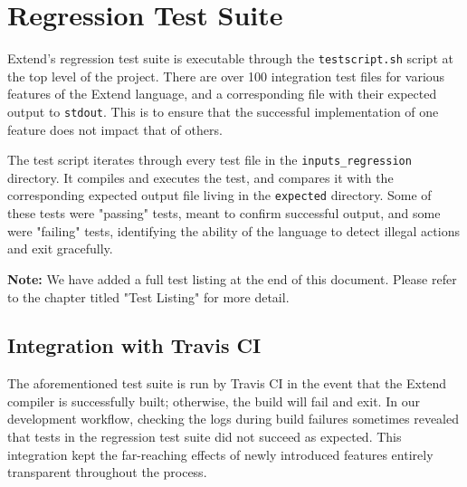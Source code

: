 \section{Regression Test Suite}
Extend's regression test suite is executable through the \texttt{testscript.sh} script at the top level of the project. There are over 100 integration test files for various features of the Extend language, and a corresponding file with their expected output to \texttt{stdout}. This is to ensure that the successful implementation of one feature does not impact that of others.

\medskip \noindent
The test script iterates through every test file in the \texttt{inputs\_regression} directory. It compiles and executes the test, and compares it with the corresponding expected output file living in the \texttt{expected} directory. Some of these tests were "passing" tests, meant to confirm successful output, and some were "failing" tests, identifying the ability of the language to detect illegal actions and exit gracefully.

\medskip \noindent
\textbf{Note:} We have added a full test listing at the end of this document. Please refer to the chapter titled "Test Listing" for more detail.

  \subsection{Integration with Travis CI}
  The aforementioned test suite is run by Travis CI in the event that the Extend compiler is successfully built; otherwise, the build will fail and exit. In our development workflow, checking the logs during build failures sometimes revealed that tests in the regression test suite did not succeed as expected. This integration kept the far-reaching effects of newly introduced features entirely transparent throughout the process.
